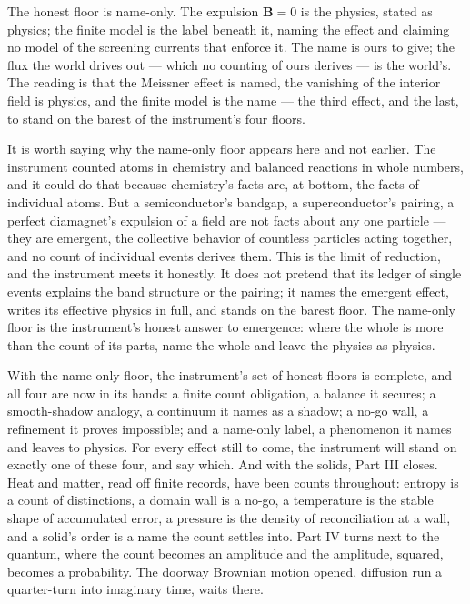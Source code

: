 The honest floor is name-only. The expulsion $\mathbf{B} = 0$ is the physics, stated as physics; the finite
model is the label beneath it, naming the effect and claiming no model of the screening currents that enforce
it. The name is ours to give; the flux the world drives out --- which no counting of ours derives --- is the
world's. The reading is that the Meissner effect is named, the vanishing of the interior field is physics, and
the finite model is the name --- the third effect, and the last, to stand on the barest of the instrument's
four floors.

It is worth saying why the name-only floor appears here and not earlier. The instrument counted atoms in chemistry
and balanced reactions in whole numbers, and it could do that because chemistry's facts are, at
bottom, the facts of individual atoms. But a semiconductor's bandgap, a superconductor's pairing, a perfect
diamagnet's expulsion of a field are not facts about any one particle --- they are emergent, the collective
behavior of countless particles acting together, and no count of individual events derives them. This is the
limit of reduction, and the instrument meets it honestly. It does not pretend that its ledger of single
events explains the band structure or the pairing; it names the emergent effect, writes its effective physics
in full, and stands on the barest floor. The name-only floor is the instrument's honest answer to emergence:
where the whole is more than the count of its parts, name the whole and leave the physics as physics.

\bigskip

With the name-only floor, the instrument's set of honest floors is complete, and all four are now in its
hands: a finite count obligation, a balance it secures; a smooth-shadow analogy, a continuum it names as a
shadow; a no-go wall, a refinement it proves impossible; and a name-only label, a phenomenon it names and
leaves to physics. For every effect still to come, the instrument will stand on exactly one of
these four, and say which. And with the solids, Part III closes. Heat and matter, read off finite records,
have been counts throughout: entropy is a count of distinctions, a domain wall is a no-go, a temperature is
the stable shape of accumulated error, a pressure is the density of reconciliation at a wall, and a solid's
order is a name the count settles into. Part IV turns next to the quantum, where the count becomes an amplitude and the amplitude, squared,
becomes a probability. The doorway Brownian
motion opened, diffusion run a quarter-turn into imaginary time, waits there.

